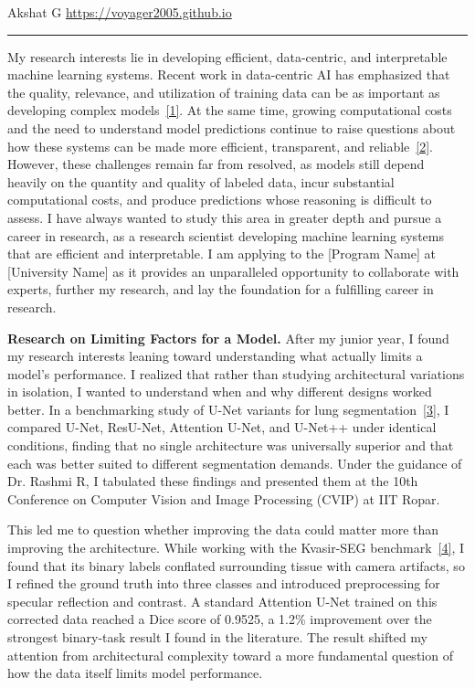 \documentclass[12pt]{article}
\begin{document}
{\small Akshat G \hfill \url{https://voyager2005.github.io} \par}
\vspace{4pt}
\hrule
\vspace{8pt}

My research interests lie in developing efficient, data-centric, and interpretable machine learning systems.  Recent work in data-centric AI has emphasized that the quality, relevance, and utilization of training data can be as important as developing complex models~\hyperref[ref1]{[1]}. At the same time, growing computational costs and the need to understand model predictions continue to raise questions about how these systems can be made more efficient, transparent, and reliable~\hyperref[ref2]{[2]}. However, these challenges remain far from resolved, as models still depend heavily on the quantity and quality of labeled data, incur substantial computational costs, and produce predictions whose reasoning is difficult to assess. I have always wanted to study this area in greater depth and pursue a career in research, as a research scientist developing machine learning systems that are efficient and interpretable. I am applying to the [Program Name] at [University Name] as it provides an unparalleled opportunity to collaborate with experts, further my research, and lay the foundation for a fulfilling career in research.

\vspace{8pt}

\textbf{Research on Limiting Factors for a Model.} After my junior year, I found my research interests leaning toward understanding what actually limits a model's performance. I realized that rather than studying architectural variations in isolation, I wanted to understand when and why different designs worked better. In a benchmarking study of U-Net variants for lung segmentation~\hyperref[ref3]{[3]}, I compared U-Net, ResU-Net, Attention U-Net, and U-Net++ under identical conditions, finding that no single architecture was universally superior and that each was better suited to different segmentation demands. Under the guidance of Dr. Rashmi R, I tabulated these findings and presented them at the 10th Conference on Computer Vision and Image Processing (CVIP) at IIT Ropar.

This led me to question whether improving the data could matter more than improving the architecture. While working with the Kvasir-SEG benchmark~\hyperref[ref4]{[4]}, I found that its binary labels conflated surrounding tissue with camera artifacts, so I refined the ground truth into three classes and introduced preprocessing for specular reflection and contrast. A standard Attention U-Net trained on this corrected data reached a Dice score of 0.9525, a 1.2\% improvement over the strongest binary-task result I found in the literature. The result shifted my attention from architectural complexity toward a more fundamental question of how the data itself limits model performance.
\end{document}
